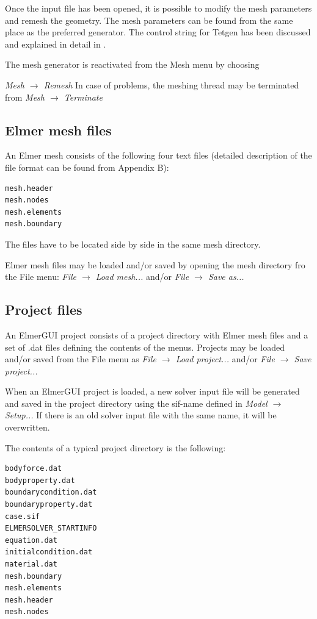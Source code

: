 \documentclass[a4paper,12pt]{article}
\newcommand{\menu}[2]{{\it \vskip2mm #1 $\rightarrow$ #2 \vskip2mm}}
\begin{document}
Once the input file has been opened, it is possible to modify the mesh parameters
and remesh the geometry. The mesh parameters can be found from the same place as the preferred generator. The control string for Tetgen has been discussed and explained in detail in \cite{TetgenHome}.

The mesh generator is reactivated from the Mesh menu by choosing

\menu{Mesh}{Remesh}
\noindent In case of problems, the meshing thread may be terminated from
\menu{Mesh}{Terminate}

\subsection{Elmer mesh files}

An Elmer mesh consists of the following four text files (detailed description of the file format can be found from Appendix B):

\begin{footnotesize}
\begin{verbatim}
mesh.header 
mesh.nodes 
mesh.elements 
mesh.boundary 
\end{verbatim}
\end{footnotesize}

\noindent The files have to be located side by side in the same mesh directory.

Elmer mesh files may be loaded and/or saved by opening the mesh directory fro the File menu:
\menu{File}{Load mesh...}
\noindent and/or
\menu{File}{Save as...}

\subsection{Project files}

An ElmerGUI project consists of a project directory with Elmer mesh files and a set of
.dat files defining the contents of the menus. Projects may be loaded and/or saved from
the File menu as
\menu{File}{Load project...}
\noindent and/or
\menu{File}{Save project...}

When an ElmerGUI project is loaded, a new solver input file will be generated and saved
in the project directory using the sif-name defined in
\menu{Model}{Setup...}
\noindent If there is an old solver input file with the same name, it will be overwritten.

The contents of a typical project directory is the following:

\begin{footnotesize}
\begin{verbatim}
bodyforce.dat 
bodyproperty.dat 
boundarycondition.dat 
boundaryproperty.dat 
case.sif 
ELMERSOLVER_STARTINFO 
equation.dat 
initialcondition.dat 
material.dat 
mesh.boundary 
mesh.elements 
mesh.header 
mesh.nodes
\end{verbatim}
\end{footnotesize}
\end{document}
